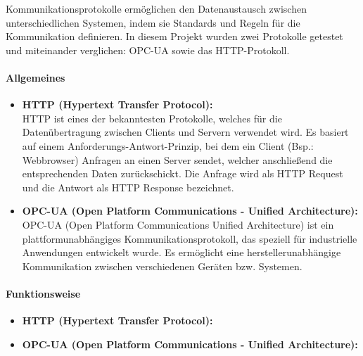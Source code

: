     Kommunikationsprotokolle ermöglichen den Datenaustausch zwischen unterschiedlichen Systemen, indem sie Standards und Regeln für die Kommunikation definieren. In diesem Projekt wurden zwei Protokolle getestet und miteinander verglichen: OPC-UA sowie das HTTP-Protokoll.


         \paragraph{Allgemeines}

        \begin{itemize}
            \item \textbf{HTTP (Hypertext Transfer Protocol):}  \mbox{} \\
            HTTP ist eines der bekanntesten Protokolle, welches für die Datenübertragung zwischen Clients und Servern verwendet wird. Es basiert auf einem Anforderungs-Antwort-Prinzip, bei dem ein Client (Bsp.: Webbrowser) Anfragen an einen Server sendet, welcher anschließend die entsprechenden Daten zurückschickt. Die Anfrage wird als HTTP Request und die Antwort als HTTP Response bezeichnet.\cite{HTTP-Allgemein}
            
            \item \textbf{OPC-UA (Open Platform Communications - Unified Architecture):} \mbox{} \\
            OPC-UA (Open Platform Communications Unified Architecture) ist ein plattformunabhängiges Kommunikationsprotokoll, das speziell für industrielle Anwendungen entwickelt wurde. Es ermöglicht eine herstellerunabhängige Kommunikation zwischen verschiedenen Geräten bzw. Systemen. \cite{OPC-UA}
        \end{itemize}

        \paragraph{Funktionsweise}

            \begin{itemize}
                \item \textbf{{HTTP (Hypertext Transfer Protocol):}} \mbox{} \\
                
            
                \item \textbf{{OPC-UA (Open Platform Communications - Unified Architecture):}} \mbox{} \\
                
            \end{itemize}
        
